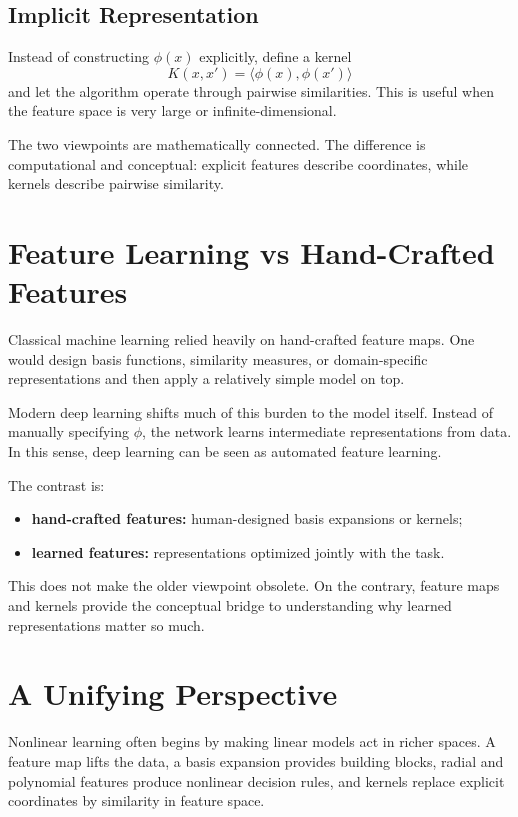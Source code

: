 \subsection{Implicit Representation}

Instead of constructing $\phi(x)$ explicitly, define a kernel
\[
K(x,x')=\langle \phi(x),\phi(x')\rangle
\]
and let the algorithm operate through pairwise similarities. This is useful when the feature space is very large or infinite-dimensional.

The two viewpoints are mathematically connected. The difference is computational and conceptual: explicit features describe coordinates, while kernels describe pairwise similarity.

\section{Feature Learning vs Hand-Crafted Features}

Classical machine learning relied heavily on hand-crafted feature maps. One would design basis functions, similarity measures, or domain-specific representations and then apply a relatively simple model on top.

Modern deep learning shifts much of this burden to the model itself. Instead of manually specifying $\phi$, the network learns intermediate representations from data. In this sense, deep learning can be seen as automated feature learning.

The contrast is:
\begin{itemize}
    \item \textbf{hand-crafted features:} human-designed basis expansions or kernels;
    \item \textbf{learned features:} representations optimized jointly with the task.
\end{itemize}

This does not make the older viewpoint obsolete. On the contrary, feature maps and kernels provide the conceptual bridge to understanding why learned representations matter so much.

\section{A Unifying Perspective}

Nonlinear learning often begins by making linear models act in richer spaces. A feature map lifts the data, a basis expansion provides building blocks, radial and polynomial features produce nonlinear decision rules, and kernels replace explicit coordinates by similarity in feature space.

